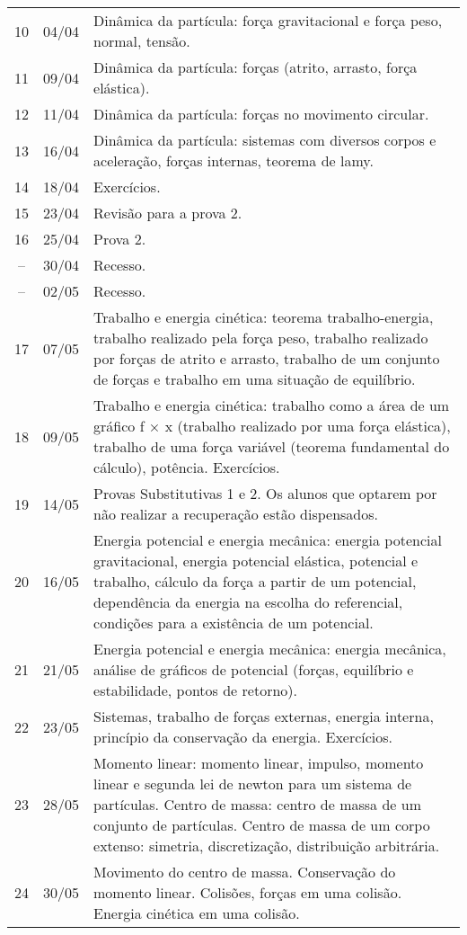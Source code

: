 \begin{center}
\begin{longtable}{ccp{70mm}}
10 & 04/04 & Dinâmica da partícula: força gravitacional e força peso, normal, tensão. \\
11 & 09/04 & Dinâmica da partícula: forças (atrito, arrasto, força elástica). \\
12 & 11/04 & Dinâmica da partícula: forças no movimento circular. \\
13 & 16/04 & Dinâmica da partícula: sistemas com diversos corpos e aceleração, forças internas, teorema de lamy. \\
14 & 18/04 & Exercícios. \\
15 & 23/04 & Revisão para a prova 2. \\
16 & 25/04 & Prova 2. \\
-- & 30/04 & Recesso. \\
-- & 02/05 & Recesso. \\
17 & 07/05 & Trabalho e energia cinética: teorema trabalho-energia, trabalho realizado pela força peso, trabalho realizado por forças de atrito e arrasto, trabalho de um conjunto de forças e trabalho em uma situação de equilíbrio. \\
18 & 09/05 & Trabalho e energia cinética: trabalho como a área de um gráfico f × x (trabalho realizado por uma força elástica), trabalho de uma força variável (teorema fundamental do cálculo), potência. Exercícios. \\
19 & 14/05 & Provas Substitutivas 1 e 2. Os alunos que optarem por não realizar a recuperação estão dispensados. \\
20 & 16/05 & Energia potencial e energia mecânica: energia potencial gravitacional, energia potencial elástica, potencial e trabalho, cálculo da força a partir de um potencial, dependência da energia na escolha do referencial, condições para a existência de um potencial. \\
21 & 21/05 & Energia potencial e energia mecânica: energia mecânica, análise de gráficos de potencial (forças, equilíbrio e estabilidade, pontos de retorno).  \\
22 & 23/05 & Sistemas, trabalho de forças externas, energia interna, princípio da conservação da energia. Exercícios. \\
23 & 28/05 & Momento linear: momento linear, impulso, momento linear e segunda lei de newton para um sistema de partículas. Centro de massa: centro de massa de um conjunto de partículas. Centro de massa de um corpo extenso: simetria, discretização, distribuição arbitrária.  \\
24 & 30/05 & Movimento do centro de massa. Conservação do momento linear. Colisões, forças em uma colisão. Energia cinética em uma colisão.  \\

\end{longtable}
\end{center}
